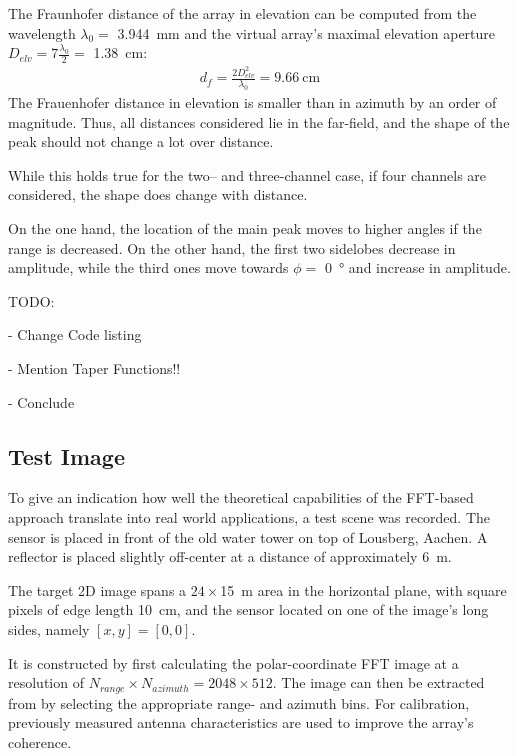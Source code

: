 The Fraunhofer distance of the array in elevation can be computed from the wavelength $\lambda_0=$ \SIlist{3.944}{\mm}
and the virtual array's maximal elevation aperture $D_{elv} = 7 \frac{\lambda_0}{2}=$ \SI{1.38}{\cm}:
\begin{align}
    d_f  = \frac{2D_{elv}^2}{\lambda_0}
    = \SI{9.66}{\cm}
\end{align}
The Frauenhofer distance in elevation is smaller than in azimuth by an order of magnitude.
Thus, all distances considered lie in the far-field,
and the shape of the peak should not change a lot over distance.

While this holds true for the two-- and three-channel case, if four channels are considered,
the shape does change with distance.

On the one hand, the location of the main peak moves to higher angles if the range is decreased.
On the other hand, the first two sidelobes decrease in amplitude,
while the third ones move towards $\phi=$ \SI{0}{\degree} and increase in amplitude.

TODO:

- Change Code listing

- Mention Taper Functions!!

- Conclude


\subsection{Test Image}
\label{ssec:fft_result}
To give an indication how well the theoretical capabilities of the FFT-based approach translate into real world applications,
a test scene was recorded. The sensor is placed in front of the old water tower on top of Lousberg, Aachen.
A reflector is placed slightly off-center at a distance of approximately \SI{6}{\m}.

The target 2D image spans a $24 \times$\SI{15}{\m} area in the horizontal plane,
with square pixels of edge length \SI{10}{\cm},
and the sensor located on one of the image's long sides, namely $[x,y] = [0,0]$.

It is constructed by first calculating the polar-coordinate FFT image at a resolution of $N_{range}\times N_{azimuth} = 2048 \times 512$.
The image can then be extracted from by selecting the appropriate range- and azimuth bins.
For calibration, previously measured antenna characteristics are used to improve the array's coherence.


